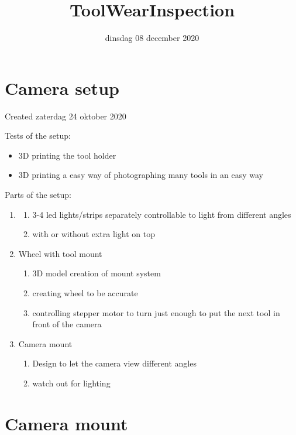 \documentclass{article}
\title{ToolWearInspection}
\date{dinsdag 08 december 2020}
\author{}
\begin{document}
\maketitle

		\section{Camera setup}

Created zaterdag 24 oktober 2020



Tests of the setup: 

\begin{itemize}
\item 3D printing the tool holder
\item 3D printing a easy way of photographing many tools in an easy way
\end{itemize}




Parts of the setup:

\begin{enumerate}[1]
\item
	\begin{enumerate}[a]
	\item 3-4 led lights/strips separately controllable to light from different angles
	\item with or without extra light on top
	\end{enumerate}
\item Wheel with tool mount
	\begin{enumerate}[a]
	\item 3D model creation of mount system
	\item creating wheel to be accurate
	\item controlling stepper motor to turn just enough to put the next tool in front of the camera
	\end{enumerate}
\item Camera mount
	\begin{enumerate}[a]
	\item Design to let the camera view different angles
	\item watch out for lighting
	\end{enumerate}
\end{enumerate}





		\section{Camera mount}
\end{document}
